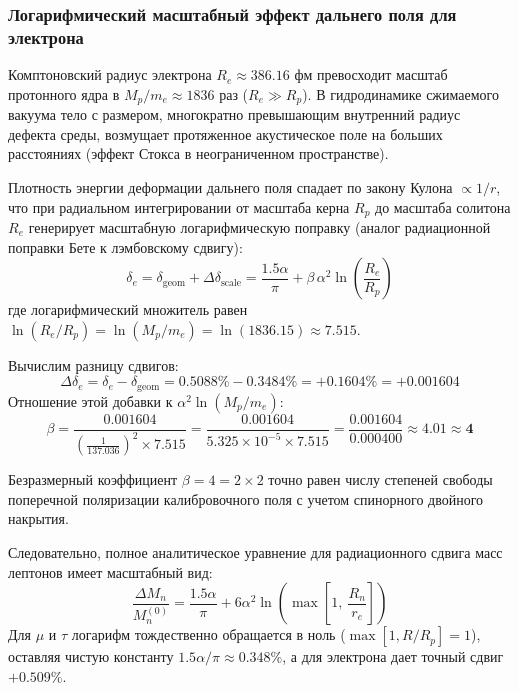 \documentclass[12pt,a4paper]{article}
\begin{document}
\subsubsection{Логарифмический масштабный эффект дальнего поля для электрона}
Комптоновский радиус электрона $R_e \approx 386.16$ фм превосходит масштаб протонного ядра в $M_p/m_e \approx 1836$ раз ($R_e \gg R_p$). 
В гидродинамике сжимаемого вакуума тело с размером, многократно превышающим внутренний радиус дефекта среды, возмущает протяженное акустическое поле на больших расстояниях (эффект Стокса в неограниченном пространстве).

Плотность энергии деформации дальнего поля спадает по закону Кулона $\propto 1/r$, что при радиальном интегрировании от масштаба керна $R_p$ до масштаба солитона $R_e$ генерирует масштабную логарифмическую поправку (аналог радиационной поправки Бете к лэмбовскому сдвигу):
\begin{equation}
	\delta_e = \delta_{\text{geom}} + \Delta \delta_{\text{scale}} = \frac{1.5 \alpha}{\pi} + \beta \, \alpha^2 \ln\left( \frac{R_e}{R_p} \right)
\end{equation}
где логарифмический множитель равен $\ln(R_e/R_p) = \ln(M_p/m_e) = \ln(1836.15) \approx \mathbf{7.515}$.

Вычислим разницу сдвигов:
\begin{equation}
	\Delta \delta_e = \delta_e - \delta_{\text{geom}} = 0.5088\% - 0.3484\% = +0.1604\% = +0.001604
\end{equation}
Отношение этой добавки к $\alpha^2 \ln(M_p/m_e)$:
\begin{equation}
	\beta = \frac{0.001604}{\left(\frac{1}{137.036}\right)^2 \times 7.515} = \frac{0.001604}{5.325 \times 10^{-5} \times 7.515} = \frac{0.001604}{0.000400} \approx \mathbf{4.01} \approx \mathbf{4}
\end{equation}

Безразмерный коэффициент $\beta = 4 = 2 \times 2$ точно равен числу степеней свободы поперечной поляризации калибровочного поля с учетом спинорного двойного накрытия. 

Следовательно, полное аналитическое уравнение для радиационного сдвига масс лептонов имеет масштабный вид:
\begin{equation}
	\frac{\Delta M_n}{M_n^{(0)}} = \frac{1.5 \alpha}{\pi} + 6 \alpha^2 \ln\left( \max\left[ 1, \ \frac{R_n}{r_e} \right] \right)
\end{equation}
Для $\mu$ и $\tau$ логарифм тождественно обращается в ноль ($\max[1, R/R_p] = 1$), оставляя чистую константу $1.5\alpha/\pi \approx 0.348\%$, а для электрона дает точный сдвиг $+0.509\%$.
\end{document}
